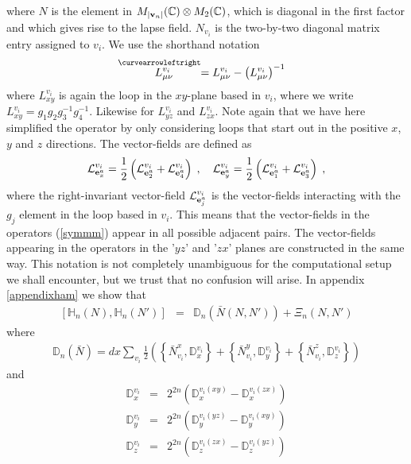 \documentclass[12pt]{article}
\newcommand{\nn}{\nonumber}
\def\m{\mu}
\def\n{\nu}
\def\cl{{\cal L}}
\begin{document}
where $N$ is the element in $M_{\vert {\bf v}_n \vert}(\mathbb{C})\otimes  M_{2}(\mathbb{C})$, which is diagonal in the first factor and which gives rise to the lapse field. $N_{v_i}$ is the two-by-two diagonal matrix entry assigned to $v_i$.  We use the shorthand notation 
$$
\stackrel{\hspace{-3mm}\curvearrowleftright}{L^{v_i}_{\m \n}}  =  L^{v_i}_{\m \n}  - \left( L^{v_i}_{ \m \n} \right)^{-1} 
$$
where $L^{v_i}_{xy}$ is again the loop in the $xy$-plane based in $v_i$, where we write $L^{v_i}_{xy}=g_1 g_2 g^{-1}_3 g^{-1}_4$. Likewise for $L^{v_i}_{yz}$ and $L^{v_i}_{zx}$. Note again that we have here simplified the operator by only considering loops that start out in the positive $x$, $y$ and $z$ directions. The vector-fields are defined as
$$
\cl^{v_i}_{{\bf e}^a_x} =  \frac{1}{2}\left(  \cl^{v_i}_{{\bf e}^a_2} +\cl^{v_i}_{{\bf e}^a_4}    \right)   \;,\quad \cl^{v_i}_{{\bf e}^a_y} = \frac{1}{2}\left(\cl^{v_i}_{{\bf e}^a_1} +\cl^{v_i}_{{\bf e}^a_3}   \right)\;,
$$ 
where the right-invariant vector-field $ \cl^{v_i}_{{\bf e}^a_j}  $ is the vector-fields interacting with the $g_j$ element in the loop based in $v_i$. This means that the vector-fields in the operators (\ref{symmm}) appear in all possible adjacent pairs. The vector-fields appearing in the operators in the '$yz$' and '$zx$' planes are constructed in the same way. This notation is not completely unambiguous for the computational setup we shall encounter, but we trust that no confusion will arise.
%
%
%
In appendix \ref{appendixham} we show that
\begin{eqnarray}
\left[\mathds{H}_n(N), \mathds{H}_n(N')\right] &=& \mathds{D}_n (\bar{N}(N,N')) + \Xi_n(N,N')
\label{pochahontas}
\end{eqnarray}
where
\begin{eqnarray}
\mathds{D}_n (\bar{N}) = dx \sum_{v_i} \frac{1}{2}\left(  \left\{\bar{N}_{v_i}^x , \mathds{D}^{v_i}_x\right\}   + \left\{ \bar{N}_{v_i}^y,\mathds{D}^{v_i}_y\right\}  +\left\{ \bar{N}_{v_i}^z, \mathds{D}^{v_i}_z \right\}   \right)
\nn
\end{eqnarray}
and
\begin{eqnarray}
\mathds{D}^{v_i}_x &=& 2^{2n} \left( \mathds{D}^{v_i(xy)}_x -  \mathds{D}^{v_i(zx)}_x \right)
\nn\\
\mathds{D}^{v_i}_y &=& 2^{2n} \left( \mathds{D}^{v_i(yz)}_y -  \mathds{D}^{v_i(xy)}_y \right)
\nn\\
\mathds{D}^{v_i}_z &=&2^{2n} \left(  \mathds{D}^{v_i(zx)}_z -  \mathds{D}^{v_i(yz)}_z \right)
\nn
\end{eqnarray}
\end{document}

